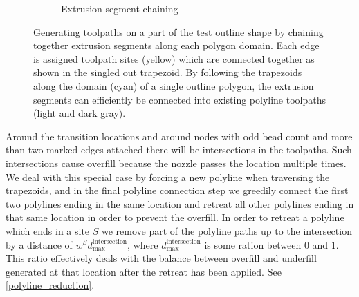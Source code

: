 \begin{figure}
\begin{subfigure}{.45\columnwidth}
\caption{Extrusion segment chaining}\label{segment_generation_chaining}
\end{subfigure}
\caption{
Generating toolpaths on a part of the test outline shape by chaining together extrusion segments along each polygon domain.
Each edge is assigned toolpath sites (yellow) which are connected together as shown in the singled out trapezoid.
By following the trapezoids along the domain (cyan) of a single outline polygon,
the extrusion segments can efficiently be connected into existing polyline toolpaths (light and dark gray).
}
\label{segment_generation}
\end{figure}


Around the transition locations and around nodes with odd bead count and more than two marked edges attached there will be intersections in the toolpaths.
Such intersections cause overfill because the nozzle passes the location multiple times.
We deal with this special case by forcing a new polyline when traversing the trapezoids, and in the final polyline connection step we greedily connect the first two polylines ending in the same location and retreat all other polylines ending in that same location in order to prevent the overfill.
In order to retreat a polyline which ends in a site $S$ we remove part of the polyline paths up to the intersection by a distance of $w^S d_\text{max}^\text{intersection}$, where $d_\text{max}^\text{intersection}$ is some ration between $0$ and $1$.
This ratio effectively deals with the balance between overfill and underfill generated at that location after the retreat has been applied.
See \cref{polyline_reduction}.


